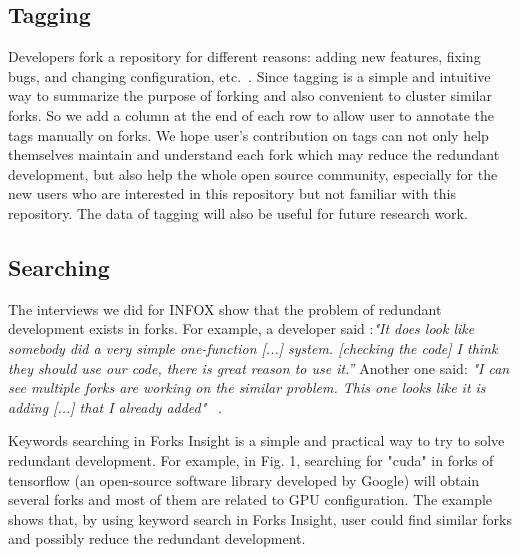 \subsection{Tagging}
%
Developers fork a repository for different reasons: adding new features, fixing bugs, and changing configuration, etc.~\cite{Mikkonen2011,Robles2012,dubinsky2013exploratory,stanciulescu2015forked}.
%
Since tagging is a simple and intuitive way to summarize the purpose of forking and also convenient to cluster similar forks. So we add a column at the end of each row to allow user to annotate the tags manually on forks. We hope user's contribution on tags can not only help themselves maintain and understand each fork which may reduce the redundant development, but also help the whole open source community, especially for the new users who are interested in this repository but not familiar with this repository. The data of tagging will also be useful for future research work.


\subsection{Searching}

The interviews we did for INFOX show that the problem of redundant development exists in forks. For example, a developer said :\emph{"It does look like somebody did a very simple one-function [...] system. [checking the code] I think they should use our code, there is great reason to use it.''} Another one said: \emph{"I can see multiple forks are working on the similar problem. This one looks like it is adding [...] that I already added"} ~\cite{ZSLXWK:ICSE18}.

Keywords searching in Forks Insight is a simple and practical way to try to solve redundant development. For example, in Fig. 1, searching for "cuda" in forks of tensorflow (an open-source software library developed by Google) will obtain several forks and most of them are related to GPU configuration. The example shows that, by using keyword search in Forks Insight, user could find similar forks and possibly reduce the redundant development.

\iffalse
\begin{figure}[H]
\centering
\texttt{[image: shot2.png]}
\caption{An example of searching for similar forks.}
\vspace{-10pt}
\end{figure}
\fi

